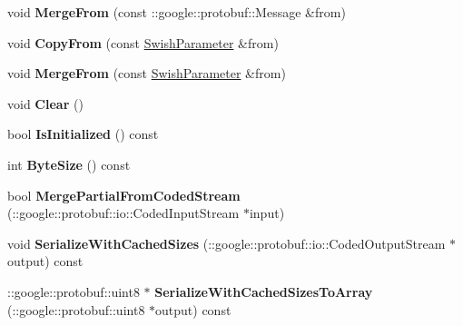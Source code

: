 \begin{DoxyCompactItemize}
void {\bfseries Merge\+From} (const \+::google\+::protobuf\+::\+Message \&from)
\item 
\mbox{\label{classcaffe_1_1_swish_parameter_a699e5ab78e72f650bde18b5ddd3e8ca4}} 
void {\bfseries Copy\+From} (const \mbox{\hyperlink{classcaffe_1_1_swish_parameter}{Swish\+Parameter}} \&from)
\item 
\mbox{\label{classcaffe_1_1_swish_parameter_a8dc1dc25ccb94e1e3b7d501016d02366}} 
void {\bfseries Merge\+From} (const \mbox{\hyperlink{classcaffe_1_1_swish_parameter}{Swish\+Parameter}} \&from)
\item 
\mbox{\label{classcaffe_1_1_swish_parameter_a447a8a5f3f289f913188d197e26065d5}} 
void {\bfseries Clear} ()
\item 
\mbox{\label{classcaffe_1_1_swish_parameter_a3e75e32fb531542d7f9eba0d78ee751e}} 
bool {\bfseries Is\+Initialized} () const
\item 
\mbox{\label{classcaffe_1_1_swish_parameter_af90106f90cb9100b742c586c85493844}} 
int {\bfseries Byte\+Size} () const
\item 
\mbox{\label{classcaffe_1_1_swish_parameter_aa8c30590238b4736bdbad5c02be0fed2}} 
bool {\bfseries Merge\+Partial\+From\+Coded\+Stream} (\+::google\+::protobuf\+::io\+::\+Coded\+Input\+Stream $\ast$input)
\item 
\mbox{\label{classcaffe_1_1_swish_parameter_aff36cbcf2fbfa47e6ae19659a2e76002}} 
void {\bfseries Serialize\+With\+Cached\+Sizes} (\+::google\+::protobuf\+::io\+::\+Coded\+Output\+Stream $\ast$output) const
\item 
\mbox{\label{classcaffe_1_1_swish_parameter_a0069d7c989894108eeb6b8962fb2bcfb}} 
\+::google\+::protobuf\+::uint8 $\ast$ {\bfseries Serialize\+With\+Cached\+Sizes\+To\+Array} (\+::google\+::protobuf\+::uint8 $\ast$output) const
\item 
\mbox{\label{classcaffe_1_1_swish_parameter_af06c5cfc15e76061d099dba9d3fac1fd}} 

\end{DoxyCompactItemize}
